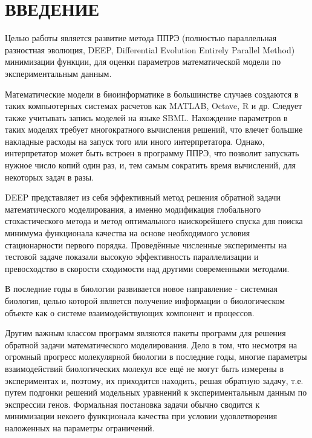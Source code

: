 \chapter*{ВВЕДЕНИЕ}

Целью работы является развитие метода ППРЭ (полностью параллельная разностная эволюция, DEEP, Differential Evolution Entirely Parallel Method) минимизации функции, для оценки параметров математической модели по экспериментальным данным.

Математические модели в биоинформатике в большинстве случаев создаются в таких компьютерных системах расчетов как MATLAB, Octave, R и др. Следует также учитывать запись моделей на языке SBML. Нахождение параметров в таких моделях требует многократного вычисления решений, что влечет большие накладные расходы на запуск того или иного интерпретатора. Однако, интерпретатор может быть встроен в программу ППРЭ, что позволит запускать нужное число копий один раз, и, тем самым сократить время вычислений, для некоторых задач в разы.


DEEP представляет из себя эффективный метод решения обратной задачи математического моделирования, а именно модификация глобального стохастического метода и метод оптимального наискорейшего спуска для поиска минимума функционала качества на основе необходимого условия стационарности первого порядка. Проведённые численные эксперименты на тестовой задаче показали высокую эффективность параллелизации и превосходство в скорости сходимости над другими современными методами.

В последние годы в биологии развивается новое направление - системная биология, целью которой является получение информации о биологическом объекте как о системе взаимодействующих компонент и процессов.

Другим важным классом программ являются пакеты программ для решения обратной задачи математического моделирования. Дело в том, что несмотря на огромный прогресс молекулярной биологии в последние годы, многие параметры взаимодействий биологических молекул все ещё не могут быть измерены в экспериментах и, поэтому, их приходится находить, решая обратную задачу, т.е. путем подгонки решений модельных уравнений к экспериментальным данным по экспрессии генов. Формальная постановка задачи обычно сводится к минимизации некоего функционала качества при условии удовлетворения наложенных на параметры ограничений.

